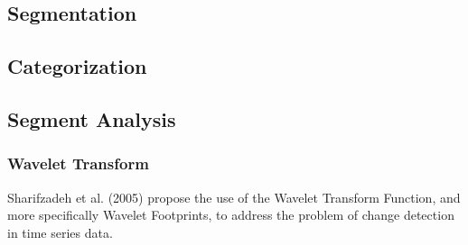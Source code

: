 \documentclass[12pt,a4paper]{report}
\begin{document}
\subsection{Segmentation}
\subsection{Categorization}
\subsection{Segment Analysis}
\subsubsection{Wavelet Transform}
Sharifzadeh et al. (2005) propose the use of the Wavelet Transform Function, and more specifically Wavelet Footprints,
to address the problem of change detection in time series data.
\end{document}
